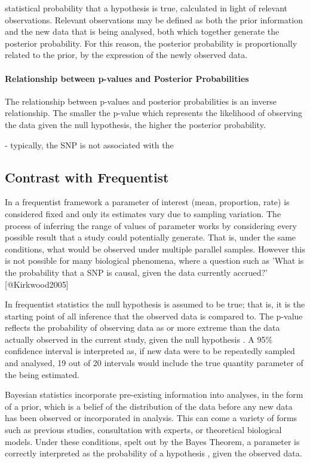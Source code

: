 statistical probability that a hypothesis is true, calculated in light of relevant observations. Relevant observations may be defined as both the prior information and the new data that is being analysed, both which together generate the posterior probability. For this reason, the posterior probability is proportionally related to the prior, by the expression of the newly observed data. 

\paragraph{Relationship between p-values and Posterior Probabilities}
The relationship between p-values and posterior probabilities is an inverse relationship. The smaller the p-value which represents the likelihood of observing the data given the null hypothesis, the higher the posterior probability. 

- typically, the SNP is not associated with the 


\subsection{Contrast with Frequentist}

In a frequentist framework a parameter of interest (mean, proportion, rate) is considered fixed and only its estimates vary due to sampling variation. The process of inferring the range of values of  parameter works by considering every possible result that a study could potentially generate. That is, under the same conditions, what would be observed under multiple parallel samples. However this is not possible for many biological phenomena, where a question such as 'What is the probability that a SNP is causal, given the data currently accrued?' [@Kirkwood2005]  

In frequentist statistics the null hypothesis is assumed to be true; that is, it is the starting point of all inference that the observed data is compared to. The p-value reflects the probability of observing data as or more extreme than the data actually observed in the current study, given the null hypothesis \cite{Gurrin2000}. A 95\% confidence interval is interpreted as, if new data were to be repeatedly sampled and analysed, 19 out of 20 intervals would include the true quantity parameter of the being estimated. 

Bayesian statistics incorporate pre-existing information into analyses, in the form of a prior, which is a belief of the distribution of the data before any new data has been observed or incorporated in analysis. This can come a variety of forms such as previous studies, consultation with experts, or theoretical biological models. Under these conditions, spelt out by the Bayes Theorem, a parameter is correctly interpreted as the probability of a hypothesis , given the observed data. 


